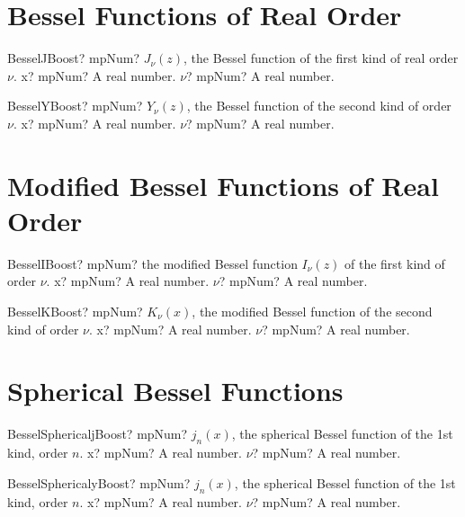 \documentclass[12pt,a4paper,openany]{book}
\begin{document}
\section{Bessel Functions of Real Order}

\begin{mpFunctionsExtract}
\mpFunctionTwo
{BesselJBoost? mpNum? $J_{\nu}(z)$, the Bessel function of the first kind of real order $\nu$.}
{x? mpNum? A real number.}
{$\nu$? mpNum? A real number.}
\end{mpFunctionsExtract}

\begin{mpFunctionsExtract}
\mpFunctionTwo
{BesselYBoost? mpNum? $Y_{\nu}(z)$, the Bessel function of the second kind of order $\nu$.}
{x? mpNum? A real number.}
{$\nu$? mpNum? A real number.}
\end{mpFunctionsExtract}

\section{Modified Bessel Functions of Real Order}

\begin{mpFunctionsExtract}
\mpFunctionTwo
{BesselIBoost? mpNum? the modified Bessel function $I_{\nu}(z)$ of the first kind of order $\nu$.}
{x? mpNum? A real number.}
{$\nu$? mpNum? A real number.}
\end{mpFunctionsExtract}

\begin{mpFunctionsExtract}
\mpFunctionTwo
{BesselKBoost? mpNum? $K_{\nu}(x)$, the modified Bessel function of the second kind of order $\nu$.}
{x? mpNum? A real number.}
{$\nu$? mpNum? A real number.}
\end{mpFunctionsExtract}

\section{Spherical Bessel Functions}

\begin{mpFunctionsExtract}
\mpFunctionTwo
{BesselSphericaljBoost? mpNum? $j_n(x)$, the spherical Bessel function of the 1st kind, order $n$.}
{x? mpNum? A real number.}
{$\nu$? mpNum? A real number.}
\end{mpFunctionsExtract}

\begin{mpFunctionsExtract}
\mpFunctionTwo
{BesselSphericalyBoost? mpNum? $j_n(x)$, the spherical Bessel function of the 1st kind, order $n$.}
{x? mpNum? A real number.}
{$\nu$? mpNum? A real number.}
\end{mpFunctionsExtract}
\end{document}
